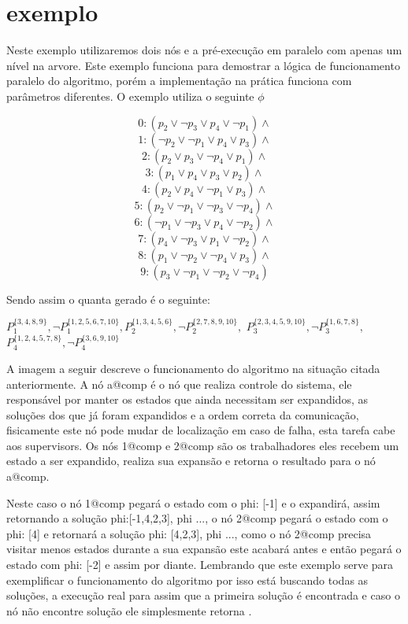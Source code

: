 \documentclass{ufsc-thesis}
\begin{document}
\section{exemplo}

Neste exemplo utilizaremos dois nós e a pré-execução em paralelo com apenas um nível na arvore. Este 
exemplo funciona para demostrar a lógica de funcionamento paralelo do algoritmo, porém a implementação 
na prática funciona com parâmetros diferentes. O exemplo utiliza o seguinte $\phi$

$$0: ( p_2\vee\neg p_3\vee p_4\vee\neg p_1) \wedge $$
$$1: ( \neg p_2\vee\neg p_1\vee p_4\vee p_3) \wedge $$
$$2: ( p_2\vee p_3\vee\neg p_4\vee p_1) \wedge $$
$$3: ( p_1\vee p_4\vee p_3\vee p_2) \wedge $$
$$4: ( p_2\vee p_4\vee\neg p_1\vee p_3) \wedge $$
$$5: ( p_2\vee\neg p_1\vee\neg p_3\vee\neg p_4) \wedge $$
$$6: ( \neg p_1\vee\neg p_3 \vee p_4\vee\neg p_2) \wedge $$
$$7: ( p_4\vee\neg p_3\vee p_1\vee\neg p_2) \wedge $$
$$8: ( p_1\vee\neg p_2 \vee\neg p_4\vee p_3) \wedge $$
$$9: ( p_3\vee\neg p_1\vee\neg p_2\vee\neg p_4) $$

Sendo assim o quanta gerado é o seguinte:

$P_1^{\{3,4,8,9\}}, \neg P_1^{\{1,2,5,6,7,10\}}, P_2^{\{1,3,4,5,6\}}, \neg P_2^{\{2,7,8,9,10\}},$
$P_3^{\{2,3,4,5,9,10\}}, \neg P_3^{\{1,6,7,8\}}, $
$P_4^{\{1,2,4,5,7,8\}}, \neg P_4^{\{3,6,9,10\}} $

A imagem a seguir descreve o funcionamento do algoritmo na situação citada anteriormente. A nó 
a@comp é o nó que realiza controle do sistema, ele responsável por manter os estados que ainda 
necessitam ser expandidos, as soluções dos que já foram expandidos e a ordem correta da comunicação, 
fisicamente este nó pode mudar de localização em caso de falha, esta tarefa cabe aos supervisors. 
Os nós 1@comp e 2@comp são os trabalhadores eles recebem um estado a ser expandido, realiza sua expansão 
e retorna o resultado para o nó a@comp.

Neste caso o nó 1@comp pegará o estado com o phi: [-1] e o expandirá, assim retornando a 
solução {phi:[-1,4,2,3], phi ...}, o nó 2@comp pegará o estado com o phi: [4] e retornará a solução 
{phi: [4,2,3], phi ...}, como o nó 2@comp precisa visitar menos estados durante a sua expansão este 
acabará antes e então pegará o estado com phi: [-2] e assim por diante. Lembrando que este exemplo 
serve para exemplificar o funcionamento do algoritmo por isso está buscando todas as soluções, a 
execução real para assim que a primeira solução é encontrada e caso o nó não encontre solução ele 
simplesmente retorna {}.
\end{document}
